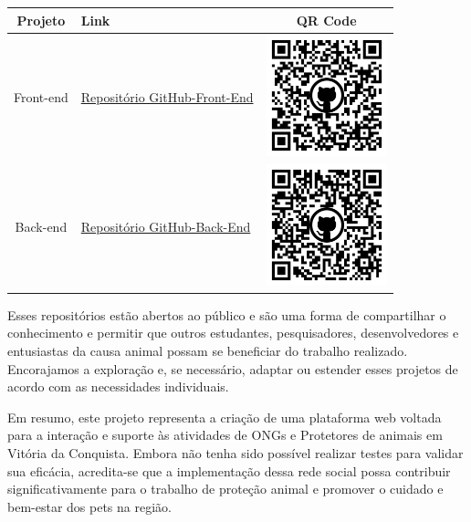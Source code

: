 \begin{table}[htbp]
\centering
\renewcommand{\arraystretch}{1.5}
\begin{tabular}{|c|>{\centering\arraybackslash}m{6cm}|c|}
\hline
\textbf{Projeto} & \textbf{Link} & \textbf{QR Code} \\
\hline
Front-end & \href{https://github.com/EdiomarNogueira/front_mypet}{Repositório GitHub-Front-End} & \includegraphics[width=3.5cm]{arquivos/ImgLinks/qrcodeFront.png} \\
\hline
Back-end & \href{https://github.com/EdiomarNogueira/api_mypet}{Repositório GitHub-Back-End} & \includegraphics[width=3.5cm]{arquivos/ImgLinks/qrcodeBack.png} \\
\hline
\end{tabular}
\end{table}


Esses repositórios estão abertos ao público e são uma forma de compartilhar o conhecimento e permitir que outros estudantes, pesquisadores, desenvolvedores e entusiastas da causa animal possam se beneficiar do trabalho realizado. Encorajamos a exploração e, se necessário, adaptar ou estender esses projetos de acordo com as necessidades individuais.

Em resumo, este projeto representa a criação de uma plataforma web voltada para a interação e suporte às atividades de ONGs e Protetores de animais em Vitória da Conquista. Embora não tenha sido possível realizar testes para validar sua eficácia, acredita-se que a implementação dessa rede social possa contribuir significativamente para o trabalho de proteção animal e promover o cuidado e bem-estar dos pets na região. 

